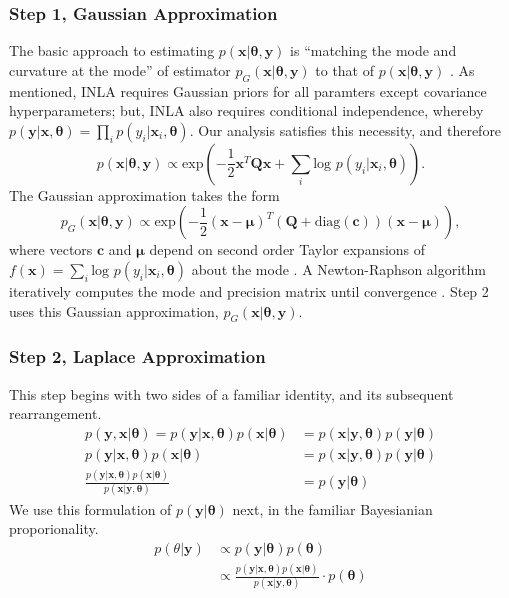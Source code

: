 \subsubsection{Step 1, Gaussian Approximation} %

The basic approach to estimating $p(\pmb{x}|\pmb{\theta}, \pmb{y})$ is ``matching the mode and curvature at the mode'' of estimator $p_{G}(\pmb{x}|\pmb{\theta}, \pmb{y})$ to that of $p(\pmb{x}|\pmb{\theta}, \pmb{y})$ \citep{Rue2005}. As mentioned, INLA requires Gaussian priors for all paramters except covariance hyperparameters; but, INLA also requires conditional independence, whereby $p(\pmb{y}|\pmb{x}, \pmb{\theta}) = \prod_{i} p(y_{i}|\pmb{x}_{i},\pmb{\theta})$. Our analysis satisfies this necessity, and therefore $$p(\pmb{x}|\pmb{\theta},\pmb{y}) \propto \text{exp}\left(-\frac{1}{2}\pmb{x}^{T}\pmb{Q x} + \sum_{i} \text{log }p(y_{i}|\pmb{x}_{i},\pmb{\theta}) \right).$$ The Gaussian approximation takes the form
$$p_{G}(\pmb{x}|\pmb{\theta},\pmb{y}) \propto \text{exp} \left( -\frac{1}{2}(\pmb{x-\mu})^{T} (\pmb{Q} + \text{diag}(\pmb{c}) ) (\pmb{x - \mu}) \right),$$
where vectors $\pmb{c}$ and $\pmb{\mu}$ depend on second order Taylor expansions of $f(\pmb{x}) = \sum_{i} \text{log }p(y_{i}|\pmb{x}_{i},\pmb{\theta})$ about the mode \citep{Lindstrom2014}. A Newton-Raphson algorithm iteratively computes the mode and precision matrix until convergence \citep{Rue2009}. Step 2 uses this Gaussian approximation, $p_{G}(\pmb{x}|\pmb{\theta},\pmb{y})$.

\subsubsection{Step 2, Laplace Approximation}  %

This step begins with two sides of a familiar identity, and its subsequent rearrangement.
\begin{align}
p(\pmb{y} , \pmb{x} | \pmb{\theta}) = p(\pmb{y} | \pmb{x}, \pmb{\theta}) p(\pmb{x} | \pmb{\theta})  &= p(\pmb{x} | \pmb{y}, \pmb{\theta}) p(\pmb{y} | \pmb{\theta}) \\
p(\pmb{y} | \pmb{x}, \pmb{\theta}) p(\pmb{x} | \pmb{\theta}) &= p(\pmb{x} | \pmb{y}, \pmb{\theta}) p(\pmb{y} | \pmb{\theta}) \\
\frac{p(\pmb{y} | \pmb{x}, \pmb{\theta}) p(\pmb{x} | \pmb{\theta})} {p(\pmb{x} | \pmb{y}, \pmb{\theta})} &= p(\pmb{y} | \pmb{\theta})  
\end{align}
We use this formulation of $p(\pmb{y} | \pmb{\theta})$ next, in the familiar Bayesianian proporionality.
\begin{align}
p(\theta|\pmb{y}) & \propto p(\pmb{y}|\pmb{\theta})p(\pmb{\theta}) \\
& \propto \frac{p(\pmb{y} | \pmb{x}, \pmb{\theta}) p(\pmb{x} | \pmb{\theta})}{p(\pmb{x} | \pmb{y}, \pmb{\theta})} \cdot p(\pmb{\theta})
\end{align}

